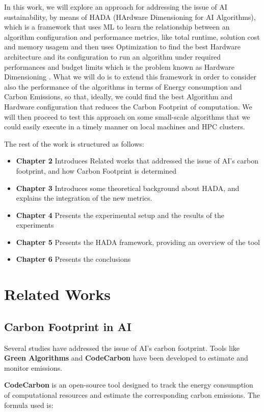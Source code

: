 \documentclass[a4paper,singleside,12pt]{report} %
\begin{document}
In this work, we will explore an approach for addressing the issue of AI sustainability, by means of HADA (HArdware 
Dimensioning for AI Algorithms), which is a framework that uses ML to learn the relationship between an algorithm 
configuration and performance metrics, like total runtime, solution cost and memory usagem and then uses Optimization to find 
the best  Hardware architecture and its configuration to run an algorithm under required performances and budget limits
which is the problem known as Hardware Dimensioning \cite{DEFILIPPO2022109199}. What we will do is to extend this framework
in order to consider also the performance of the algorithms in terms of Energy consumption and Carbon Emissions, so that, 
ideally, we could find the best Algorithm and Hardware configuration that reduces the Carbon Footprint of computation. We 
will then proceed to test this approach on some small-scale algorithms that we could easily execute in a timely manner 
on local machines and HPC clusters.

The rest of the work is structured as follows:
\begin{itemize}
    \item \textbf{Chapter 2} Introduces Related works that addressed the issue of AI's carbon footprint, and how Carbon Footprint is determined
    \item \textbf{Chapter 3} Introduces some theoretical background about HADA, and explains the integration of the new metrics.
    \item \textbf{Chapter 4} Presents the experimental setup and the results of the experiments
    \item \textbf{Chapter 5} Presents the HADA framework, providing an overview of the tool
    \item \textbf{Chapter 6} Presents the conclusions
\end{itemize}

\chapter{Related Works}
\section{Carbon Footprint in AI}
Several studies have addressed the issue of AI’s carbon footprint. Tools like \textbf{Green Algorithms} and 
\textbf{CodeCarbon} have been developed to estimate and monitor emissions.

\textbf{CodeCarbon} is an open-source tool designed to track the energy consumption of computational resources 
and estimate the corresponding carbon emissions. The formula used is:
\end{document}

